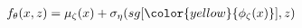 \documentclass[preview]{standalone}
\begin{document}
\begin{align*}
f_\theta (x,z) =  \mu_{\zeta}(x) + \sigma_{\eta}(sg[\color{yellow}{\phi_\zeta (x)}],z)
\end{align*}
\end{document}
